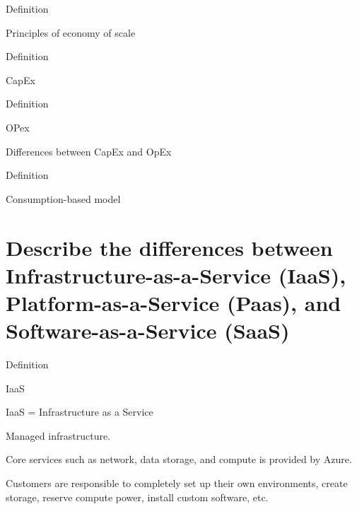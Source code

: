 \documentclass{scrartcl}
\newenvironment{flashcard}[2][]{%
    #1
    \vfill
    \centerline{\Large{#2}}
    \vfill
    \newpage
}
{\newpage}
\newcommand{\sectioncard}[1]{
    \vspace*{\stretch{1}}
    \section{#1}
    \vspace*{\stretch{1}}
    \pagebreak
}
\begin{document}
    \begin{flashcard}[Definition]{Principles of economy of scale}

    \end{flashcard}

    \begin{flashcard}[Definition]{CapEx}

    \end{flashcard}

    \begin{flashcard}[Definition]{OPex}

    \end{flashcard}

    \begin{flashcard}{Differences between CapEx and OpEx}

    \end{flashcard}


    \begin{flashcard}[Definition]{Consumption-based model}

    \end{flashcard}

    \sectioncard{Describe the differences between Infrastructure-as-a-Service (IaaS), Platform-as-a-Service (Paas), and Software-as-a-Service (SaaS)}

    \begin{flashcard}[Definition]{IaaS}
        IaaS = Infrastructure as a Service

        Managed infrastructure.

        Core services such as network, data storage, and compute is provided by Azure.

        Customers are responsible to completely set up their own environments, create storage,
        reserve compute power, install custom software, etc.
    \end{flashcard}
\end{document}
